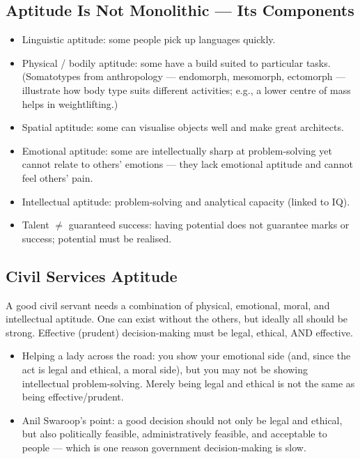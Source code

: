 \subsection{Aptitude Is Not Monolithic --- Its Components}

\begin{itemize}
\item Linguistic aptitude: some people pick up languages quickly.
\item Physical / bodily aptitude: some have a build suited to particular tasks. (Somatotypes from anthropology --- endomorph, mesomorph, ectomorph --- illustrate how body type suits different activities; e.g., a lower centre of mass helps in weightlifting.)
\item Spatial aptitude: some can visualise objects well and make great architects.
\item Emotional aptitude: some are intellectually sharp at problem-solving yet cannot relate to others' emotions --- they lack emotional aptitude and cannot feel others' pain.
\item Intellectual aptitude: problem-solving and analytical capacity (linked to IQ).
\item Talent $\neq$ guaranteed success: having potential does not guarantee marks or success; potential must be realised.
\end{itemize}

\subsection{Civil Services Aptitude}

A good civil servant needs a combination of physical, emotional, moral, and intellectual aptitude. One can exist without the others, but ideally all should be strong. Effective (prudent) decision-making must be legal, ethical, AND effective.

\begin{ExampleBox}
\begin{itemize}
\item Helping a lady across the road: you show your emotional side (and, since the act is legal and ethical, a moral side), but you may not be showing intellectual problem-solving. Merely being legal and ethical is not the same as being effective/prudent.
\item Anil Swaroop's point: a good decision should not only be legal and ethical, but also politically feasible, administratively feasible, and acceptable to people --- which is one reason government decision-making is slow.
\end{itemize}
\end{ExampleBox}

